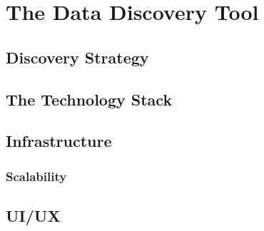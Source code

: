 \chapter{The Data Discovery Tool}\label{ch:ch2label}

\section{Discovery Strategy}


\section{The Technology Stack}

\section{Infrastructure}

\subsection{Scalability}

\section{UI/UX}